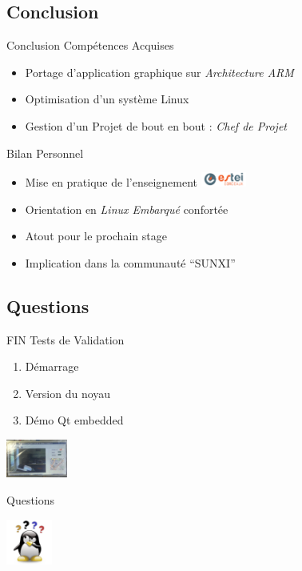\documentclass[11pt]{beamer}
\begin{document}
	\subsection{Conclusion}
	\begin{frame}{Conclusion}
	Compétences Acquises
		\begin{center}
		\begin{itemize}
			\item Portage d'application graphique sur \textit{Architecture ARM}
			\item Optimisation d'un système Linux
			\item Gestion d'un Projet de bout en bout : \textit{Chef de Projet}
		\end{itemize}
		\end{center}
	Bilan Personnel
		\begin{center}
		\begin{itemize}
			\item Mise en pratique de l'enseignement \includegraphics[width=1.5cm]{common/estei.png}
			\item Orientation en \textit{Linux Embarqué} confortée
			\item Atout pour le prochain stage
			\item Implication dans la communauté ``SUNXI''
		\end{itemize}
		\end{center}
	\end{frame}
	
	\subsection{Questions}
	\begin{frame}{FIN}	
	Tests de Validation
	\begin{enumerate}
	 \item Démarrage
	  \item Version du noyau
	    \item Démo Qt embedded
	\end{enumerate}

		\begin{center}
		  \includegraphics[width=2cm]{common/appli.png}
		\end{center}
	Questions 
		\begin{center}
		  \includegraphics[width=1.5cm]{common/dialog-question.png}
		\end{center}
	\end{frame}
	
\end{document}
